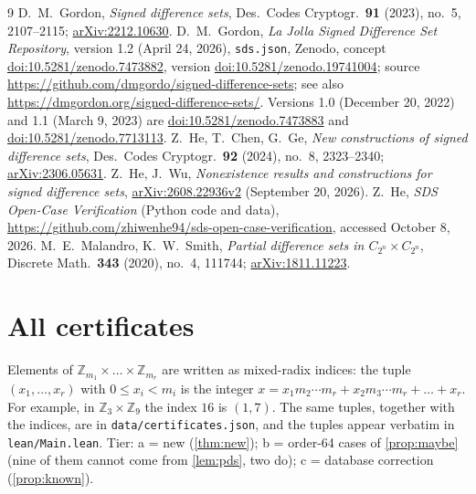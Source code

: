 \documentclass[11pt]{article}
\numberwithin{equation}{section}
\theoremstyle{definition}
\theoremstyle{remark}
\newcommand{\Z}{\mathbb Z}
\begin{document}
\begin{thebibliography}{9}
D.~M.~Gordon, \emph{Signed difference sets}, Des.\ Codes Cryptogr.\ \textbf{91} (2023), no.~5, 2107--2115;
\href{https://arxiv.org/abs/2212.10630}{arXiv:2212.10630}.
D.~M.~Gordon, \emph{La Jolla Signed Difference Set Repository}, version 1.2 (April 24, 2026),
\texttt{sds.json}, Zenodo, concept \href{https://doi.org/10.5281/zenodo.7473882}{doi:10.5281/zenodo.7473882},
version \href{https://doi.org/10.5281/zenodo.19741004}{doi:10.5281/zenodo.19741004};
source \url{https://github.com/dmgordo/signed-difference-sets}; see also
\url{https://dmgordon.org/signed-difference-sets/}. Versions 1.0 (December 20, 2022) and 1.1
(March 9, 2023) are \href{https://doi.org/10.5281/zenodo.7473883}{doi:10.5281/zenodo.7473883} and
\href{https://doi.org/10.5281/zenodo.7713113}{doi:10.5281/zenodo.7713113}.
Z.~He, T.~Chen, G.~Ge, \emph{New constructions of signed difference sets}, Des.\ Codes Cryptogr.\
\textbf{92} (2024), no.~8, 2323--2340; \href{https://arxiv.org/abs/2306.05631}{arXiv:2306.05631}.
\bibitem{HeWu2026}
Z.~He, J.~Wu, \emph{Nonexistence results and constructions for signed difference sets},
\href{https://arxiv.org/abs/2608.22936}{arXiv:2608.22936v2} (September 20, 2026).
\bibitem{HeScript}
Z.~He, \emph{SDS Open-Case Verification} (Python code and data),
\url{https://github.com/zhiwenhe94/sds-open-case-verification}, accessed October 8, 2026.
\bibitem{MalandroSmith2020}
M.~E.~Malandro, K.~W.~Smith, \emph{Partial difference sets in $C_{2^n}\times C_{2^n}$}, Discrete
Math.\ \textbf{343} (2020), no.~4, 111744; \href{https://arxiv.org/abs/1811.11223}{arXiv:1811.11223}.
\end{thebibliography}

\appendix
\section{All certificates}\label{app:certs}

Elements of $\Z_{m_1}\times\dots\times\Z_{m_r}$ are written as mixed-radix indices: the tuple
$(x_1,\dots,x_r)$ with $0\le x_i<m_i$ is the integer
$x=x_1 m_2\cdots m_r+x_2m_3\cdots m_r+\dots+x_r$. For example, in $\Z_3\times\Z_9$ the index $16$
is $(1,7)$. The same tuples, together with the indices, are in \texttt{data/certificates.json},
and the tuples appear verbatim in \texttt{lean/Main.lean}. Tier: a = new (\cref{thm:new});
b = order-64 cases of \cref{prop:maybe} (nine of them cannot come from \cref{lem:pds}, two do);
c = database correction (\cref{prop:known}).
\end{document}
